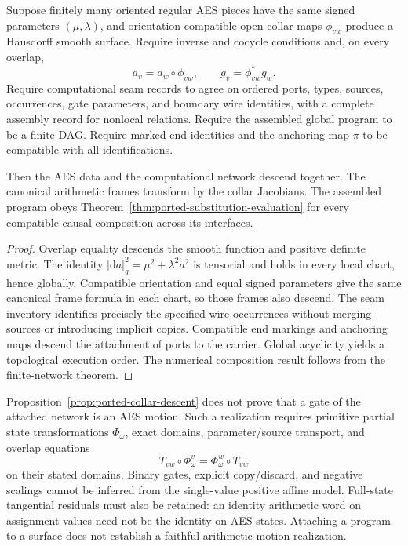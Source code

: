 \begin{proposition}
\label{prop:ported-collar-descent}
Suppose finitely many oriented regular AES pieces have the same signed
parameters $(\mu,\lambda)$, and orientation-compatible open collar maps
$\phi_{vw}$ produce a Hausdorff smooth surface.  Require inverse and cocycle
conditions and, on every overlap,
\[
  a_v=a_w\circ\phi_{vw},\qquad g_v=\phi_{vw}^{*}g_w.
\]
Require computational seam records to agree on ordered ports, types, sources,
occurrences, gate parameters, and boundary wire identities, with a complete
assembly record for nonlocal relations.  Require the assembled global program
to be a finite DAG.  Require marked end identities and the anchoring map $\pi$
to be compatible with all identifications.

Then the AES data and the computational network descend together.  The
canonical arithmetic frames transform by the collar Jacobians.  The assembled
program obeys Theorem~\ref{thm:ported-substitution-evaluation} for every
compatible causal composition across its interfaces.
\end{proposition}
\begin{proof}
Overlap equality descends the smooth function and positive definite metric.
The identity $|\mathrm da|_g^2=\mu^2+\lambda^2a^2$ is tensorial and holds in
every local chart, hence globally.  Compatible orientation and equal signed
parameters give the same canonical frame formula in each chart, so those
frames also descend.  The seam inventory identifies precisely the specified
wire occurrences without merging sources or introducing implicit copies.
Compatible end markings and anchoring maps descend the attachment of ports to
the carrier.  Global acyclicity yields a topological execution order.  The
numerical composition result follows from the finite-network theorem.
\end{proof}

\begin{warning}
\label{warn:ported-motion-bridge}
Proposition~\ref{prop:ported-collar-descent} does not prove that a gate of the
attached network is an AES motion.  Such a realization requires primitive
partial state transformations $\Phi_\omega$, exact domains, parameter/source
transport, and overlap equations
\[
  T_{vw}\circ\Phi^v_\omega=\Phi^w_\omega\circ T_{vw}
\]
on their stated domains.  Binary gates, explicit copy/discard, and negative
scalings cannot be inferred from the single-value positive affine model.
Full-state tangential residuals must also be retained: an identity arithmetic
word on assignment values need not be the identity on AES states.  Attaching a
program to a surface does not establish a faithful arithmetic-motion
realization.
\end{warning}

